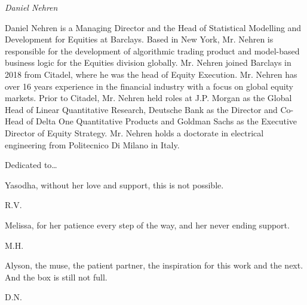 {\noindent\large\itshape Daniel Nehren} \medskip

\noindent Daniel Nehren is a Managing Director and the Head of Statistical Modelling and Development for Equities at Barclays. Based in New York, Mr. Nehren is responsible for the development of algorithmic trading product and model-based business logic for the Equities division globally. Mr. Nehren joined Barclays in 2018 from Citadel, where he was the head of Equity Execution. Mr. Nehren has over 16 years experience in the financial industry with a focus on global equity markets. Prior to Citadel, Mr. Nehren held roles at J.P. Morgan as the Global Head of Linear Quantitative Research, Deutsche Bank as the Director and Co-Head of Delta One Quantitative Products and Goldman Sachs as the Executive Director of Equity Strategy. Mr. Nehren holds a doctorate in electrical engineering from Politecnico Di Milano in Italy.



\newpage



Dedicated to\dots \vspace{0.5cm}


\begin{minipage}[t]{0.8\textwidth}
	\raggedright
		Yasodha, without her love and support, this is not possible. \par
  	\raggedleft
  	R.V.
\end{minipage} \vspace{1cm}


\begin{minipage}[t]{0.8\textwidth}
	\raggedright
		Melissa, for her patience every step of the way, and her never ending support. \par
  	\raggedleft
  	M.H.
\end{minipage} \vspace{1cm}


\begin{minipage}[t]{0.8\textwidth}
	\raggedright
		Alyson, the muse, the patient partner, the inspiration for this work and the next. And the box is still not full. \par
  	\raggedleft
  	D.N.
\end{minipage} 
